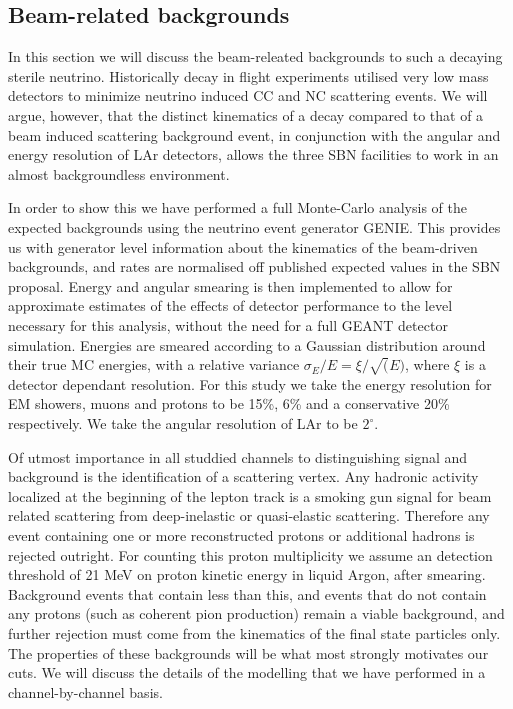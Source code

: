 \documentclass[11pt, a4paper]{article}
\begin{document}
\newpage
\subsection{Beam-related backgrounds\label{sec:bg}}
In this section we will discuss the beam-releated backgrounds to such a decaying sterile neutrino. Historically decay in flight experiments utilised very low mass detectors to minimize neutrino induced CC and NC scattering events. We will argue, however, that the distinct kinematics of a decay compared to that of a beam induced scattering background event, in conjunction with the angular and energy resolution of LAr detectors, allows the three SBN facilities to work in an almost backgroundless environment.

In order to show this we have performed a full Monte-Carlo analysis of the expected backgrounds using the neutrino event generator GENIE. This provides us with generator level information about the kinematics of the beam-driven backgrounds, and rates are normalised off published expected values in the SBN proposal. Energy and angular smearing is then implemented to allow for approximate estimates of the effects of detector performance to the level necessary for this analysis, without the need for a full GEANT detector simulation. Energies are smeared according to a Gaussian distribution around their true MC energies, with a relative variance $\sigma_E/E = \xi/ \sqrt(E) $, where $\xi$ is a detector dependant resolution. For this study we take the energy resolution for EM showers, muons and protons to be 15\%, 6\% and a conservative 20\% respectively. We take the angular resolution of LAr to be $2^{\circ}$. 

Of utmost importance in all studdied channels to distinguishing signal and background is the identification of a scattering vertex. Any hadronic activity localized at the beginning of the lepton track is a smoking gun signal for beam related scattering from deep-inelastic or quasi-elastic scattering. Therefore any event containing one or more reconstructed protons or additional hadrons is rejected outright. For counting this proton multiplicity we assume an detection threshold of 21 MeV on proton kinetic energy in liquid Argon, after smearing. Background events that contain less than this, and events that do not contain any protons (such as coherent pion production) remain a viable background, and further rejection must come from the kinematics of the final state particles only. The properties of these backgrounds will be what most strongly motivates our cuts. We will discuss the details of the modelling that we have performed in a channel-by-channel basis.
\end{document}
